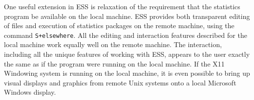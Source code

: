 \documentclass{article}
\newcommand*{\Splus}{\textsc{S-Plus}}
\newcommand{\stexttt}[1]{{\small\texttt{#1}}}
\newenvironment{Comment}{\begin{quote}\small\itshape }{\end{quote}}
\begin{document}

One useful extension in ESS is relaxation of the requirement that the
statistics program be available on the local machine.  ESS provides
both transparent editing of files and execution of statistics packages
on the remote machine, using the command \stexttt{S+elsewhere}.
All the editing and interaction features described for the local
machine work equally well on the remote machine.  The interaction,
including all the unique features of working with ESS, appears to the
user exactly the same as if the program were running on the local
machine.  If the X11 Windowing system is running on the local machine,
it is even possible to bring up visual displays and graphics from
remote Unix systems onto a local Microsoft Windows display.


\end{document}
